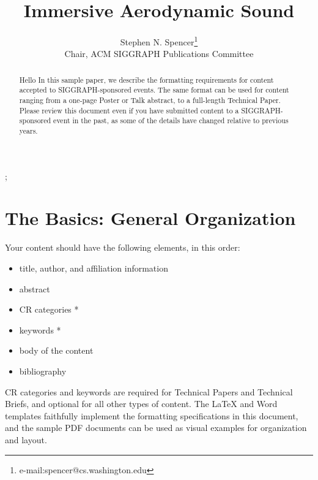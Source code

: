 \documentclass[tog]{acmsiggraph}
\title{Immersive Aerodynamic Sound}
\author{Stephen N. Spencer\thanks{e-mail:spencer@cs.washington.edu}\\Chair, ACM SIGGRAPH Publications Committee}
\begin{document}


\maketitle

\begin{abstract}

Hello In this sample paper, we describe the formatting requirements for
content accepted to SIGGRAPH-sponsored events. The same format can be
used for content ranging from a one-page Poster or Talk abstract, to a
full-length Technical Paper. Please review this document even if you
have submitted content to a SIGGRAPH-sponsored event in the past, as
some of the details have changed relative to previous years. 

\end{abstract}

\begin{CRcatlist}
  ;
\end{CRcatlist}

\keywordlist


\copyrightspace

\section{The Basics: General Organization}

Your content should have the following elements, in this order:
\begin{itemize}
\item title, author, and affiliation information
\item abstract
\item CR categories *
\item keywords *
\item body of the content
\item bibliography
\end{itemize}

CR categories and keywords are required for Technical Papers and
Technical Briefs, and optional for all other types of content. The
\LaTeX{} and Word templates faithfully implement the formatting
specifications in this document, and the sample PDF documents can be
used as visual examples for organization and layout.
\end{document}

